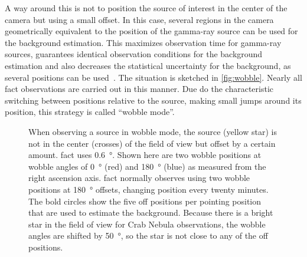 A way around this is not to position the source of interest in the center of the 
camera but using a small offset.
In this case, several regions in the camera geometrically
equivalent to the position of the gamma-ray source can be used for the background estimation.
This maximizes observation time for gamma-ray sources, guarantees identical observation
conditions for the background estimation and also decreases the
statistical uncertainty for the background, as several positions can be used~\cite{wobble}.
The situation is sketched in \autoref{fig:wobble}.
Nearly all \gls{fact} observations are carried out in this manner.
Due do the characteristic switching between positions relative to the source,
making small jumps around its position, this strategy is called \enquote{wobble mode}.

\begin{figure}
  \centering
  
  \caption{%
    When observing a source in wobble mode, the source (yellow star) is not in the center (crosses) of the field of view but offset by a certain amount.
    \gls{fact} uses \SI{0.6}{\degree}. 
    Shown here are two wobble positions at wobble angles of \SI{0}{\degree} (red) and \SI{180}{\degree} (blue) as measured from the right ascension axis.
    \gls{fact} normally observes using two wobble positions at \SI{180}{\degree} offsets,
    changing position every twenty minutes.
    The bold circles show the five off positions per pointing position that are
    used to estimate the background.
    Because there is a bright star in the field of view for Crab Nebula observations,
    the wobble angles are shifted by \SI{50}{\degree}, so the star is not close to
    any of the off positions.
  }\label{fig:wobble}
\end{figure}
